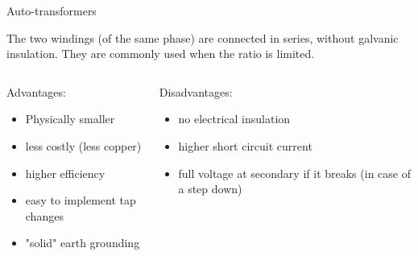 \begin{frame}{Auto-transformers}

The two windings (of the same phase) are connected in series, without galvanic insulation. 
They are commonly used when the ratio is limited.


\begin{columns}
    \begin{column}{0.45\textwidth}
Advantages: 
\begin{itemize}
\item Physically smaller
\item less costly (less copper)
\item higher efficiency
\item easy to implement tap changes
\item "solid" earth grounding
\end{itemize}
\end{column}
\begin{column}{0.45\textwidth}
Disadvantages:
\begin{itemize}
\item no electrical insulation
\item higher short circuit current
\item full voltage at secondary if it breaks (in case of a step down)
\end{itemize}
\end{column}
\end{columns}

\end{frame}

